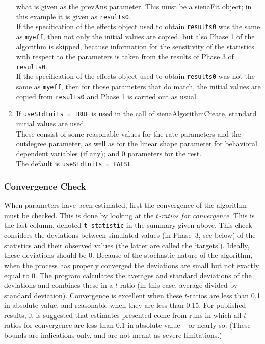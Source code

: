 \documentclass[a4paper,fleqn,11pt]{article}
\newcommand{\+}{\, + \,}
\begin{document}
\begin{enumerate}
      what is given as the
      \textsf{prevAns} parameter. This must be a
      \textsf{sienaFit} object; in this example it is given as
      \texttt{results0}.\\
      If the specification of the effects object used to obtain
      \texttt{results0} was the same as \texttt{myeff}, then not only the initial
      values are copied, but also Phase 1 of the algorithm is skipped,
      because information for the sensitivity of the statistics with
      respect to the parameters is taken from the results of Phase 3
      of \texttt{results0}.\\
      If the specification of the effects object used to obtain
      \texttt{results0} was not the same as \texttt{myeff}, then for those
      parameters that do match, the initial values are copied
      from \texttt{results0} and Phase 1 is carried out as usual.
\item If \texttt{useStdInits = TRUE} is used in the call of
      \textsf{sienaAlgorithmCreate}, standard initial values are used.\\
      These consist of some reasonable values for the rate parameters and the
      outdegree parameter, as well as for the linear shape parameter
      for behavioral dependent variables (if any);
      and 0 parameters for the rest.\\
      The default is  \texttt{useStdInits = FALSE}.
\end{enumerate}

\subsubsection{Convergence Check}
\label{S_ccheck}

When parameters have been estimated, first the
\hypertarget{T_convergence}{convergence} of the
algorithm must be checked. This is done by looking at the
\emph{$t$-ratios for convergence}. This is the last column, denoted
\texttt{t statistic} in the summary given above.
This check
considers the deviations between simulated values
(in Phase~3, see below) of the
statistics and their observed values (the latter are called the
`targets'). Ideally, these deviations should be 0. Because of the
stochastic nature of the algorithm, when the process has properly
converged the deviations are small but not exactly equal to 0.
The program calculates the averages and standard deviations of the
deviations and combines these in a $t$-ratio (in this case,
average divided by standard deviation).
Convergence is excellent when these $t$-ratios are less than 0.1
in absolute value, and reasonable when they are less than 0.15.
For published results, it is suggested that estimates presented come from runs
in which all $t$-ratios for convergence are less than 0.1 in absolute value
-- or nearly so.
(These bounds are indications only, and
are not meant as severe limitations.)
\end{document}
